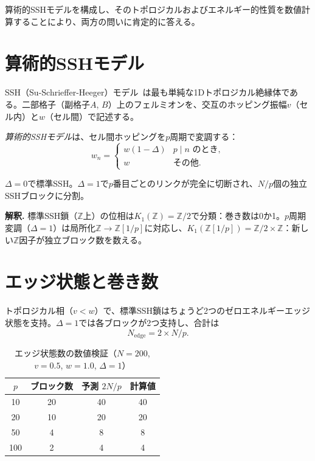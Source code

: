 \documentclass[11pt,a4paper]{article}
\newcommand{\Zp}{\mathbb{Z}[1/p]}
\begin{document}
算術的SSHモデルを構成し、そのトポロジカルおよびエネルギー的性質を数値計算することにより、両方の問いに肯定的に答える。

\section{算術的SSHモデル}

SSH（Su-Schrieffer-Heeger）モデル~\cite{SSH1979}は最も単純な1Dトポロジカル絶縁体である。二部格子（副格子$A$, $B$）上のフェルミオンを、交互のホッピング振幅$v$（セル内）と$w$（セル間）で記述する。

\emph{算術的SSHモデル}は、セル間ホッピングを$p$周期で変調する：
\begin{equation}
  w_n = \begin{cases}
    w(1-\Delta) & p \mid n \text{ のとき}, \\
    w & \text{その他}.
  \end{cases}
\end{equation}

$\Delta = 0$で標準SSH。$\Delta = 1$で$p$番目ごとのリンクが完全に切断され、$N/p$個の独立SSHブロックに分割。

\textbf{解釈.} 標準SSH鎖（$\mathbb{Z}$上）の位相は$K_1(\mathbb{Z}) = \mathbb{Z}/2$で分類：巻き数は0か1。$p$周期変調（$\Delta = 1$）は局所化$\mathbb{Z} \to \Zp$に対応し、$K_1(\Zp) = \mathbb{Z}/2 \times \mathbb{Z}$：新しい$\mathbb{Z}$因子が独立ブロック数を数える。

\section{エッジ状態と巻き数}

トポロジカル相（$v < w$）で、標準SSH鎖はちょうど2つのゼロエネルギーエッジ状態を支持。$\Delta = 1$では各ブロックが2つ支持し、合計は
\begin{equation}
  N_{\mathrm{edge}} = 2 \times N/p.
\end{equation}

\begin{table}[h]
\centering
\caption{エッジ状態数の数値検証（$N=200$, $v=0.5$, $w=1.0$, $\Delta=1$）}
\begin{tabular}{@{}cccc@{}}
\toprule
$p$ & ブロック数 & 予測 $2N/p$ & 計算値 \\
\midrule
10 & 20 & 40 & 40 \\
20 & 10 & 20 & 20 \\
50 & 4 & 8 & 8 \\
100 & 2 & 4 & 4 \\
\bottomrule
\end{tabular}
\end{table}
\end{document}

